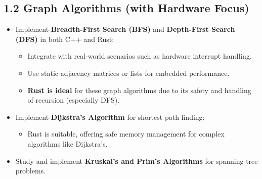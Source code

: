 \documentclass{article}
\begin{document}
\subsection*{1.2 Graph Algorithms (with Hardware Focus)}
\begin{itemize}
    \item Implement \textbf{Breadth-First Search (BFS)} and \textbf{Depth-First Search (DFS)} in both C++ and Rust:
    \begin{itemize}
        \item Integrate with real-world scenarios such as hardware interrupt handling.
        \item Use static adjacency matrices or lists for embedded performance.
        \item \textbf{Rust is ideal} for these graph algorithms due to its safety and handling of recursion (especially DFS).
    \end{itemize}
    \item Implement \textbf{Dijkstra’s Algorithm} for shortest path finding:
    \begin{itemize}
        \item Rust is suitable, offering safe memory management for complex algorithms like Dijkstra’s.
    \end{itemize}
    \item Study and implement \textbf{Kruskal’s and Prim’s Algorithms} for spanning tree problems.
\end{itemize}
\end{document}
